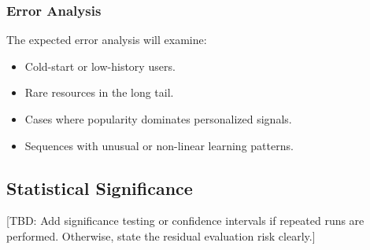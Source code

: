 \subsubsection{Error Analysis}

The expected error analysis will examine:

\begin{itemize}
    \item Cold-start or low-history users.
    \item Rare resources in the long tail.
    \item Cases where popularity dominates personalized signals.
    \item Sequences with unusual or non-linear learning patterns.
\end{itemize}

\subsection{Statistical Significance}

[TBD: Add significance testing or confidence intervals if repeated runs are performed. Otherwise, state the residual evaluation risk clearly.]

\newpage
